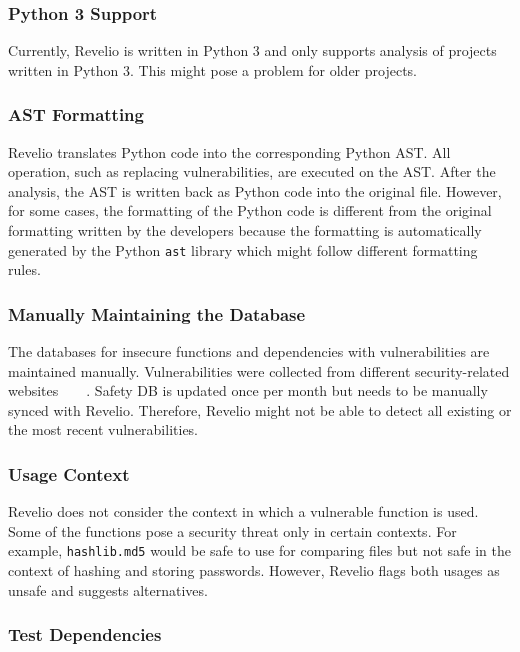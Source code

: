 \subsubsection{Python 3 Support}

Currently, Revelio is written in Python 3 and only supports analysis of projects written in Python 3. This might pose a problem for older projects. 

\subsubsection{AST Formatting}

Revelio translates Python code into the corresponding Python AST. All operation, such as replacing vulnerabilities, are executed on the AST. After the analysis, the AST is written back as Python code into the original file. However, for some cases, the formatting of the Python code is different from the original formatting written by the developers because the formatting is automatically generated by the Python \texttt{ast} library which might follow different formatting rules.  

\subsubsection{Manually Maintaining the Database}

The databases for insecure functions and dependencies with vulnerabilities are maintained manually. Vulnerabilities were collected from different security-related websites~\cite{openstack}~\cite{cvedetails}~\cite{securitytracker}~\cite{exploitablepython}. Safety DB is updated once per month but needs to be manually synced with Revelio. Therefore, Revelio might not be able to detect all existing or the most recent vulnerabilities.

\subsubsection{Usage Context}

Revelio does not consider the context in which a vulnerable function is used. Some of the functions pose a security threat only in certain contexts. For example, \texttt{hashlib.md5} would be safe to use for comparing files but not safe in the context of hashing and storing passwords. However, Revelio flags both usages as unsafe and suggests alternatives.

\subsubsection{Test Dependencies}

